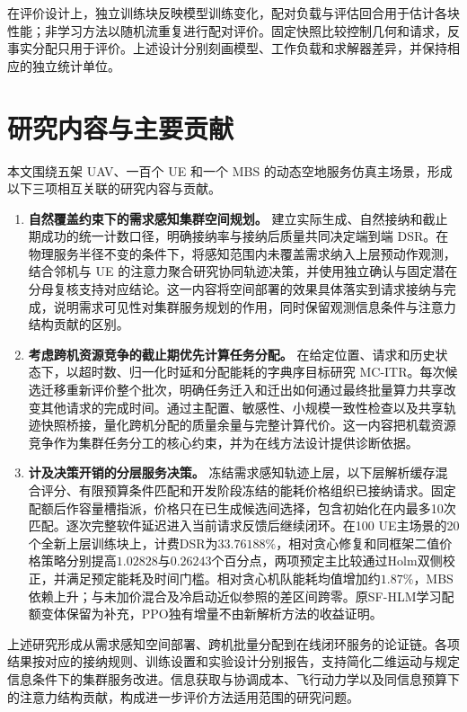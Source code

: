 在评价设计上，独立训练块反映模型训练变化，配对负载与评估回合用于估计各块性能；非学习方法以随机流重复进行配对评价。固定快照比较控制几何和请求，反事实分配只用于评价。上述设计分别刻画模型、工作负载和求解器差异，并保持相应的独立统计单位。

\section{研究内容与主要贡献}
\label{sec:contributions}

本文围绕五架 UAV、一百个 UE 和一个 MBS 的动态空地服务仿真主场景，形成以下三项相互关联的研究内容与贡献。

\begin{enumerate}
    \item \textbf{自然覆盖约束下的需求感知集群空间规划。} 建立实际生成、自然接纳和截止期成功的统一计数口径，明确接纳率与接纳后质量共同决定端到端 DSR。在物理服务半径不变的条件下，将感知范围内未覆盖需求纳入上层预动作观测，结合邻机与 UE 的注意力聚合研究协同轨迹决策，并使用独立确认与固定潜在分母复核支持对应结论。这一内容将空间部署的效果具体落实到请求接纳与完成，说明需求可见性对集群服务规划的作用，同时保留观测信息条件与注意力结构贡献的区别。
    \item \textbf{考虑跨机资源竞争的截止期优先计算任务分配。} 在给定位置、请求和历史状态下，以超时数、归一化时延和分配能耗的字典序目标研究 MC-ITR。每次候选迁移重新评价整个批次，明确任务迁入和迁出如何通过最终批量算力共享改变其他请求的完成时间。通过主配置、敏感性、小规模一致性检查以及共享轨迹快照桥接，量化跨机分配的质量余量与完整计算代价。这一内容把机载资源竞争作为集群任务分工的核心约束，并为在线方法设计提供诊断依据。
    \item \textbf{计及决策开销的分层服务决策。} 冻结需求感知轨迹上层，以下层解析缓存混合评分、有限预算条件匹配和开发阶段冻结的能耗价格组织已接纳请求。固定配额后作容量槽指派，价格只在已生成候选间选择，包含初始化在内最多10次匹配。逐次完整软件延迟进入当前请求反馈后继续闭环。在100 UE主场景的20个全新上层训练块上，计费DSR为$33.76188\%$，相对贪心修复和同框架二值价格策略分别提高$1.02828$与$0.26243$个百分点，两项预定主比较通过Holm双侧校正，并满足预定能耗及时间门槛。相对贪心机队能耗均值增加约$1.87\%$，MBS依赖上升；与未加价混合及冷启动近似参照的差区间跨零。原SF-HLM学习配额变体保留为补充，PPO独有增量不由新解析方法的收益证明。
\end{enumerate}

上述研究形成从需求感知空间部署、跨机批量分配到在线闭环服务的论证链。各项结果按对应的接纳规则、训练设置和实验设计分别报告，支持简化二维运动与规定信息条件下的集群服务改进。信息获取与协调成本、飞行动力学以及同信息预算下的注意力结构贡献，构成进一步评价方法适用范围的研究问题。

